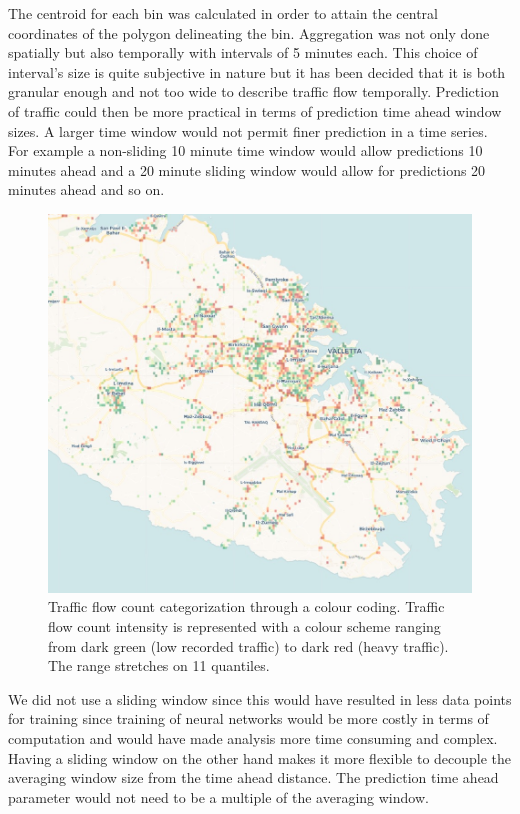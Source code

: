 \documentclass[12pt, a4paper]{report}
\theoremstyle{definition}
\theoremstyle{definition}%
\theoremstyle{definition}%
\theoremstyle{definition}%
\theoremstyle{definition}%
\theoremstyle{definition}%
\begin{document}
The centroid for each bin was calculated in order to attain the central coordinates of the polygon delineating the bin. Aggregation was not only done spatially but also temporally with intervals of 5 minutes each. This choice of interval's size is quite subjective in nature but it has been decided that it is both granular enough and not too wide to describe traffic flow temporally. Prediction of traffic could then be more practical in terms of prediction time ahead window sizes. A larger time window would not permit finer prediction in a time series. For example a non-sliding 10 minute time window would allow predictions 10 minutes ahead and a 20 minute sliding window would allow for predictions 20 minutes ahead and so on.

\begin{figure}[!]	
	\includegraphics[scale=0.5]{traffic_count_color_coded_categorization.jpg}
	\centering
	\caption[Traffic total flow count binning]{Traffic flow count categorization through a colour coding. Traffic flow count intensity is represented with a colour scheme ranging from dark green (low recorded traffic) to dark red (heavy traffic). The range stretches on 11 quantiles.}
	\label{fig:traffic_count_color_coded_categorization}
\end{figure}

We did not use a sliding window since this would have resulted in less data points for training since training of neural networks would be more costly in terms of computation and would have made analysis more time consuming and complex. Having a sliding window on the other hand makes it more flexible to decouple the averaging window size from the time ahead distance. The prediction time ahead parameter would not need to be a multiple of the averaging window.
\end{document}
